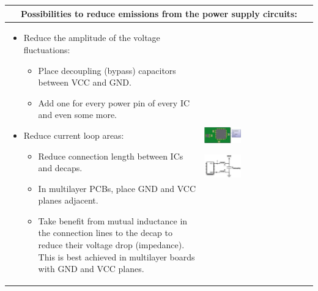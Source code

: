 		\begin{table}[h!]
		\centering
		\begin{tabular}{|m{}|m{}|}
				\multicolumn{2}{c}{\textbf{Possibilities to reduce emissions from the power supply circuits:}}
			\\
			\hline
				\begin{itemize}
					\item Reduce the amplitude of the voltage fluctuations: 
					\begin{itemize}
						\item Place decoupling (bypass) capacitors between VCC and GND. 
						\item Add one for every power pin of every IC and even some more. 
					\end{itemize}
					\item Reduce current loop areas: 
					\begin{itemize}
						\item Reduce connection length between ICs and decaps. 
						\item In multilayer PCBs, place GND and VCC planes adjacent. 
						\item Take benefit from mutual inductance in the connection lines to the decap to reduce their voltage drop (impedance). This is best achieved in multilayer boards with GND and VCC planes. 
					\end{itemize}
				\end{itemize}
			& 
				\begin{center}\includegraphics[width=0.35\textwidth]{images/Decaps.png}\end{center}  
				\begin{center}\includegraphics[width=0.35\textwidth]{images/DecapsInd.png}\end{center}  
			\\	
			\hline
			\end{tabular}
		\end{table}	


